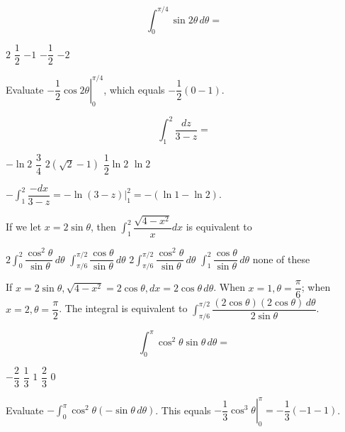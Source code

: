\newpage




\question
\[
\int_{0}^{\pi / 4} \sin 2 \theta\,d\theta=
\]
\begin{choices}
  \choice $2$
  \CorrectChoice $\dfrac{1}{2}$
  \choice $-1$
  \choice $-\dfrac{1}{2}$
  \choice $-2$
\end{choices}
\begin{solution}
Evaluate $-\left.\dfrac{1}{2} \cos 2 \theta\right|_{0} ^{\pi / 4}$, which equals $-\dfrac{1}{2}(0-1)$.
\end{solution}

\question
\[
\int_{1}^{2} \dfrac{d z}{3-z}=
\]
\begin{choices}
  \choice $-\ln 2$
  \choice $\dfrac{3}{4}$
  \choice $2(\sqrt{2}-1)$
  \choice $\dfrac{1}{2} \ln 2$
  \CorrectChoice $\ln 2$
\end{choices}
\begin{solution}
$-\int_{1}^{2} \dfrac{-d x}{3-z}=-\left.\ln (3-z)\right|_{1} ^{2}=-(\ln 1-\ln 2)$.
\end{solution}

\question
If we let $x=2 \sin \theta$, then $\int_{1}^{2} \dfrac{\sqrt{4-x^{2}}}{x} d x$ is equivalent to
\begin{choices}
  \choice $2 \int_{0}^{2} \dfrac{\cos ^{2} \theta}{\sin \theta}\,d\theta$
  \choice $\int_{\pi / 6}^{\pi / 2} \dfrac{\cos \theta}{\sin \theta}\,d\theta$
  \CorrectChoice $2 \int_{\pi / 6}^{\pi / 2} \dfrac{\cos ^{2} \theta}{\sin \theta}\,d\theta$
  \choice $\int_{1}^{2} \dfrac{\cos \theta}{\sin \theta}\,d\theta$
  \choice none of these
\end{choices}
\begin{solution}
If $x=2 \sin \theta, \sqrt{4-x^{2}}=2 \cos \theta, d x=2 \cos \theta\,d\theta$. When $x=1, \theta=\dfrac{\pi}{6}$; when $x=2, \theta=\dfrac{\pi}{2}$. The integral is equivalent to $\int_{\pi / 6}^{\pi / 2} \dfrac{(2 \cos \theta)(2 \cos \theta)\,d\theta}{2 \sin \theta}$.
\end{solution}




\newpage




\question
\[
\int_{0}^{\pi} \cos ^{2} \theta \sin \theta\,d\theta=
\]
\begin{choices}
  \choice $-\dfrac{2}{3}$
  \choice $\dfrac{1}{3}$
  \choice $1$
  \CorrectChoice $\dfrac{2}{3}$
  \choice $0$
\end{choices}
\begin{solution}
Evaluate $-\int_{0}^{\pi} \cos ^{2} \theta(-\sin \theta\,d\theta)$. This equals $-\left.\dfrac{1}{3} \cos ^{3} \theta\right|_{0} ^{\pi}=-\dfrac{1}{3}(-1-1)$.
\end{solution}

